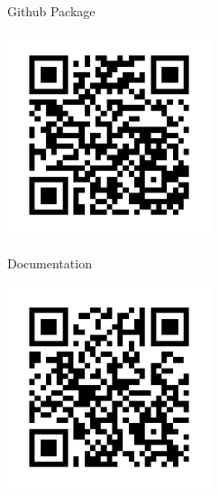 \documentclass[a0paper,fontscale=0.285]{baposter} %
\begin{document}
\begin{poster}
{\begin{multicols}{2}
  \centering
  Github Package

  \includegraphics[width=0.45\textwidth]{ldrgit.pdf}

  Documentation

  \includegraphics[width=0.45\textwidth]{ldrdoc.pdf}
\end{multicols}

}



\end{poster}
\end{document}
